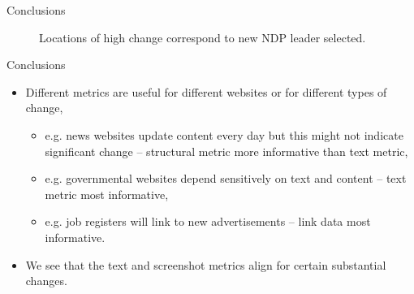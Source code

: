 \documentclass[10pt]{beamer}
\begin{document}
\begin{frame}{Conclusions}
\begin{figure}
\centering     %
{}
\caption{Locations of high change correspond to new NDP leader selected.}
\end{figure}
\end{frame}

\begin{frame}{Conclusions}
\begin{itemize}
\item Different metrics are useful for different websites or for different types of change,
\begin{itemize}
\item e.g. news websites update content every day but this might not indicate significant change -- structural metric more informative than text metric,
\item e.g. governmental websites depend sensitively on text and content -- text metric most informative,
\item e.g. job registers will link to new advertisements -- link data most informative.
\end{itemize}
\vspace{2ex}
\item We see that the text and screenshot metrics align for certain substantial changes.
\end{itemize}
\end{frame}
\end{document}
